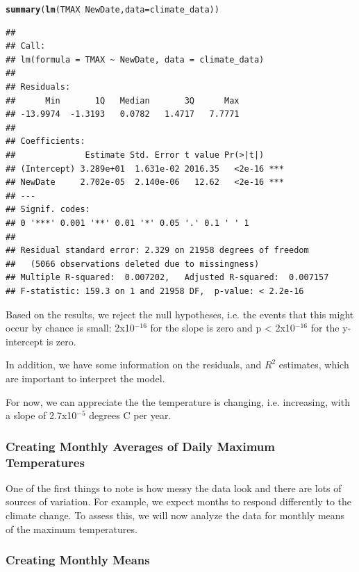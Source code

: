 \documentclass{article}\usepackage[]{graphicx}\usepackage[]{color}
\makeatletter
\newcommand{\hlopt}[1]{\textcolor[rgb]{0,0,0}{#1}}%
\newcommand{\hlstd}[1]{\textcolor[rgb]{0.345,0.345,0.345}{#1}}%
\newcommand{\hlkwc}[1]{\textcolor[rgb]{0.333,0.667,0.333}{#1}}%
\newcommand{\hlkwd}[1]{\textcolor[rgb]{0.737,0.353,0.396}{\textbf{#1}}}%
\newenvironment{kframe}{%
 \def\at@end@of@kframe{}%
 \ifinner\ifhmode%
  \def\at@end@of@kframe{\end{minipage}}%
  \begin{minipage}{\columnwidth}%
 \fi\fi%
 \def\FrameCommand##1{\hskip\@totalleftmargin \hskip-\fboxsep
 \colorbox{shadecolor}{##1}\hskip-\fboxsep
     \hskip-\linewidth \hskip-\@totalleftmargin \hskip\columnwidth}%
 \MakeFramed {\advance\hsize-\width
   \@totalleftmargin\z@ \linewidth\hsize
   \@setminipage}}%
 {\par\unskip\endMakeFramed%
 \at@end@of@kframe}
\newenvironment{knitrout}{}{} %
\makeatother
\begin{document}
\begin{knitrout}
\color{fgcolor}\begin{kframe}
\begin{alltt}
\hlkwd{summary}\hlstd{(}\hlkwd{lm}\hlstd{(TMAX} \hlopt{~} \hlstd{NewDate,} \hlkwc{data}\hlstd{=climate_data))}
\end{alltt}
\begin{verbatim}
## 
## Call:
## lm(formula = TMAX ~ NewDate, data = climate_data)
## 
## Residuals:
##      Min       1Q   Median       3Q      Max 
## -13.9974  -1.3193   0.0782   1.4717   7.7771 
## 
## Coefficients:
##              Estimate Std. Error t value Pr(>|t|)    
## (Intercept) 3.289e+01  1.631e-02 2016.35   <2e-16 ***
## NewDate     2.702e-05  2.140e-06   12.62   <2e-16 ***
## ---
## Signif. codes:  
## 0 '***' 0.001 '**' 0.01 '*' 0.05 '.' 0.1 ' ' 1
## 
## Residual standard error: 2.329 on 21958 degrees of freedom
##   (5066 observations deleted due to missingness)
## Multiple R-squared:  0.007202,	Adjusted R-squared:  0.007157 
## F-statistic: 159.3 on 1 and 21958 DF,  p-value: < 2.2e-16
\end{verbatim}
\end{kframe}
\end{knitrout}

Based on the results, we reject the null hypotheses, i.e. the events that this might occur by chance is small: 2x10$^{-16}$ for the slope is zero and p < 2x10$^{-16}$ for the y-intercept is zero. 

In addition, we have some information on the residuals, and $R^2$ estimates, which are important to interpret the model. 

For now, we can appreciate the the temperature is changing, i.e. increasing, with a slope of 2.7x10$^{-5}$ degrees C per year. 

\subsubsection{Creating Monthly Averages of Daily Maximum Temperatures}

One of the first things to note is how messy the data look and there are lots of sources of variation. For example, we expect months to respond differently to the climate change. To assess this, we will now analyze the data for monthly means of the maximum temperatures.

\subsubsection{Creating Monthly Means}
\end{document}
